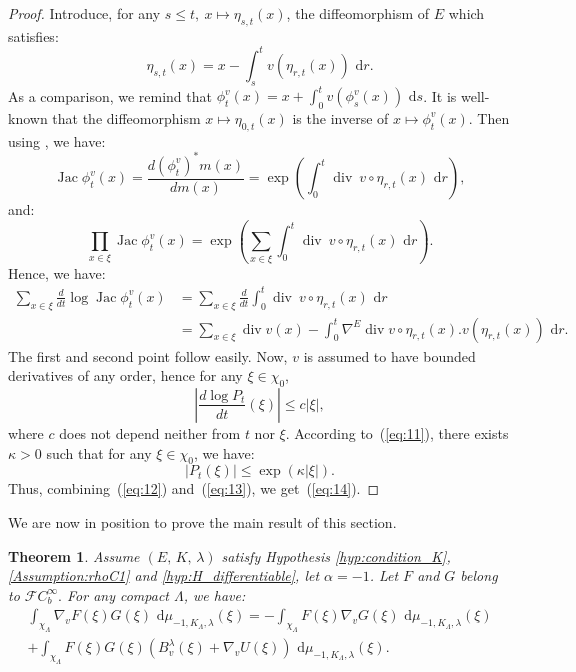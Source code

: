 \documentclass[11pt,a4paper]{amsart}
\newtheorem{Theorem}{Theorem}
\begin{document}
\begin{proof}
  Introduce, for any $s\le t,\ x\longmapsto\eta_{s,t}(x)$, the
  diffeomorphism of $E$ which satisfies:
  \begin{equation*}
    \eta_{s,t}(x)=x-\int_s^t v(\eta_{r,t}(x)){\text{ d}} r.
  \end{equation*}
  As a comparison, we remind that $\phi_t^v(x)=x+\int_0^t
  v(\phi_s^v(x)){\text{ d}} s$. It is well-known that the diffeomorphism
  $x\longmapsto \eta_{0,t}(x)$ is the inverse of $x\longmapsto
  \phi^v_t(x)$. Then using \cite{ustunel2000}, we have:
  \begin{equation}\label{eq:11}
    {\operatorname{Jac}}\phi_t^v(x)=\frac{d(\phi_t^v)^*m(x)}{dm(x)}=
    \exp\left(\int_0^t{\operatorname{div}} \ v\circ\eta_{r,t}(x){\text{ d}} r\right),
  \end{equation}
  and:
  \begin{equation*}
    \prod_{x \in \xi}{\operatorname{Jac}}\phi_t^v(x) =\exp\left(\sum_{x \in
        \xi}\int_0^t{\operatorname{div}} \ v\circ\eta_{r,t}(x){\text{ d}} r\right).
  \end{equation*}
  Hence, we have:
  \begin{align*}
    \sum_{x\in \xi} \frac{d}{dt} \log {\operatorname{Jac}} \phi_{t}^v(x)&=\sum_{x\in
      \xi}  \frac{d}{dt} \int_0^t{\operatorname{div}} \ v\circ\eta_{r,t}(x){\text{ d}} r\\
    & =\sum_{x \in\xi}{\operatorname{div}} v(x) -\int_0^t\nabla^E{\operatorname{div}} v
    \circ \eta_{r,t}(x). v(\eta_{r,t}(x)) {\text{ d}} r.
  \end{align*}
  The first and second point follow easily. Now, $v$ is assumed to
  have bounded derivatives of any order, hence for any $\xi\in
  \chi_0$,
  \begin{equation}\label{eq:12}
    \left| \frac{d\log P_t}{dt}(\xi)\right| \le c |\xi|,
  \end{equation}
  where $c$ does not depend neither from $t$ nor $\xi$. According
  to~(\ref{eq:11}), there exists $\kappa >0$ such that for any $\xi\in
  \chi_0$, we have:
  \begin{equation}\label{eq:13}
    |P_t(\xi)|\le \exp(\kappa |\xi|).
  \end{equation}
  Thus, combining~(\ref{eq:12}) and~(\ref{eq:13}), we
  get~(\ref{eq:14}).
\end{proof}
We are now in position to prove the main result of this section.
\begin{Theorem}
  \label{thm:thm_principal}
  Assume $(E,\, K,\, \lambda)$ satisfy Hypothesis
  \ref{hyp:condition_K}, \ref{Assumption:rhoC1} and
  \ref{hyp:H_differentiable}, let $\alpha=-1$. Let $F$ and $G$ belong
  to ${{\mathcal{F}C^{\infty}_b}}.$ For any compact $\Lambda$, we have:
  \begin{multline}
    \label{eq:10}
    \int_{\chi_\Lambda} \nabla_v F(\xi) G(\xi){\text{ d}}\mu_{-1,K_\Lambda,\lambda}(\xi) =-\int_{\chi_\Lambda} F(\xi)\nabla_v G(\xi){\text{ d}}\mu_{-1,K_\Lambda,\lambda}(\xi)\\
    +\int_{\chi_\Lambda} F(\xi)G(\xi)\left(B_v^\lambda
      (\xi)+\nabla_vU(\xi)\right){\text{ d}}\mu_{-1,K_\Lambda,\lambda}(\xi).
  \end{multline}
\end{Theorem}
\end{document}
